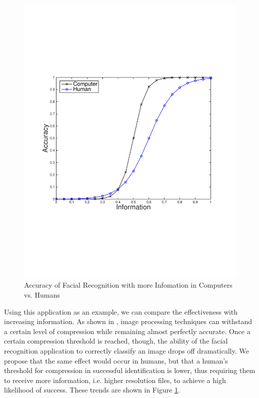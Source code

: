 \begin{figure}
\begin{centering}
    \includegraphics[clip=true, trim = 15mm 65mm 25mm 70mm, scale=0.40]{figures/example_qoi_trends/acc_vs_info_hvc_FR.pdf}
    \caption{Accuracy of Facial Recognition with more Infomation in Computers vs. Humans }
    \label{fig:acc_vs_info_hvc_FR}
\end{centering}
\end{figure}

Using this application as an example, we can compare the effectiveness with increasing information.  As shown in \cite{qoi_aware_mobile_apps}, image processing techniques can withstand a certain level of compression while remaining almost perfectly accurate.  Once a certain compression threshold is reached, though, the ability of the facial recognition application to correctly classify an image drops off dramatically.  We propose that the same effect would occur in humans, but that a human's threshold for compression in successful identification is lower, thus requiring them to receive more information, i.e. higher resolution files, to achieve a high likelihood of success.  These trends are shown in Figure \ref{fig:acc_vs_info_hvc_FR}.

